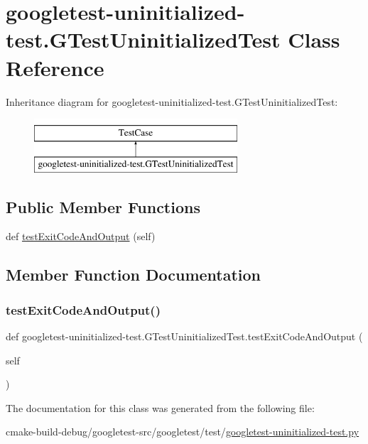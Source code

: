 \hypertarget{classgoogletest-uninitialized-test_1_1GTestUninitializedTest}{}\section{googletest-\/uninitialized-\/test.G\+Test\+Uninitialized\+Test Class Reference}
\label{classgoogletest-uninitialized-test_1_1GTestUninitializedTest}
Inheritance diagram for googletest-\/uninitialized-\/test.G\+Test\+Uninitialized\+Test\+:\begin{figure}[H]
\begin{center}
\leavevmode
\includegraphics[height=2.000000cm]{classgoogletest-uninitialized-test_1_1GTestUninitializedTest}
\end{center}
\end{figure}
\subsection*{Public Member Functions}
\begin{DoxyCompactItemize}
\item 
def \mbox{\hyperlink{classgoogletest-uninitialized-test_1_1GTestUninitializedTest_aa3c5445f3d94a94d9b252fd64f05e4a0}{test\+Exit\+Code\+And\+Output}} (self)
\end{DoxyCompactItemize}


\subsection{Member Function Documentation}
\mbox{\label{classgoogletest-uninitialized-test_1_1GTestUninitializedTest_aa3c5445f3d94a94d9b252fd64f05e4a0}} 
\subsubsection{\texorpdfstring{testExitCodeAndOutput()}{testExitCodeAndOutput()}}
{\footnotesize\ttfamily def googletest-\/uninitialized-\/test.\+G\+Test\+Uninitialized\+Test.\+test\+Exit\+Code\+And\+Output (\begin{DoxyParamCaption}\item[{}]{self }\end{DoxyParamCaption})}



The documentation for this class was generated from the following file\+:\begin{DoxyCompactItemize}
\item 
cmake-\/build-\/debug/googletest-\/src/googletest/test/\mbox{\hyperlink{googletest-uninitialized-test_8py}{googletest-\/uninitialized-\/test.\+py}}\end{DoxyCompactItemize}

